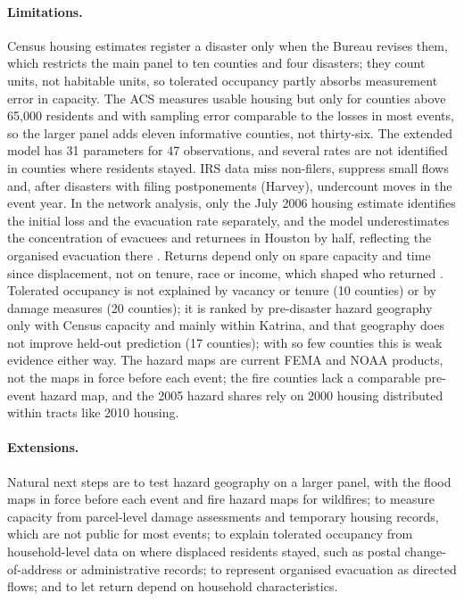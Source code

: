 \documentclass[11pt]{article}
\begin{document}
\paragraph{Limitations.} Census housing estimates register a disaster only when the Bureau revises them, which restricts the main panel to ten counties and four disasters; they count units, not habitable units, so tolerated occupancy partly absorbs measurement error in capacity. The ACS measures usable housing but only for counties above 65{,}000 residents and with sampling error comparable to the losses in most events, so the larger panel adds eleven informative counties, not thirty-six. The extended model has 31 parameters for 47 observations, and several rates are not identified in counties where residents stayed. IRS data miss non-filers, suppress small flows and, after disasters with filing postponements (Harvey), undercount moves in the event year. In the network analysis, only the July 2006 housing estimate identifies the initial loss and the evacuation rate separately, and the model underestimates the concentration of evacuees and returnees in Houston by half, reflecting the organised evacuation there \citep{McIntosh2008}. Returns depend only on spare capacity and time since displacement, not on tenure, race or income, which shaped who returned \citep{Fussell2010,GroenPolivka2010}. Tolerated occupancy is not explained by vacancy or tenure (10 counties) or by damage measures (20 counties); it is ranked by pre-disaster hazard geography only with Census capacity and mainly within Katrina, and that geography does not improve held-out prediction (17 counties); with so few counties this is weak evidence either way. The hazard maps are current FEMA and NOAA products, not the maps in force before each event; the fire counties lack a comparable pre-event hazard map, and the 2005 hazard shares rely on 2000 housing distributed within tracts like 2010 housing.

\paragraph{Extensions.} Natural next steps are to test hazard geography on a larger panel, with the flood maps in force before each event and fire hazard maps for wildfires; to measure capacity from parcel-level damage assessments and temporary housing records, which are not public for most events; to explain tolerated occupancy from household-level data on where displaced residents stayed, such as postal change-of-address or administrative records; to represent organised evacuation as directed flows; and to let return depend on household characteristics.
\end{document}
